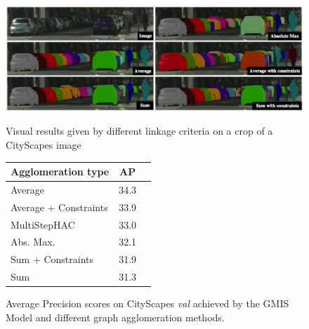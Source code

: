 \captionsetup[subtable]{labelformat=simple, labelsep=space, justification=centering, singlelinecheck=off}
\renewcommand*{\thesubtable}{(\alph{subtable})}
\begin{figure}[t]
\begin{minipage}{0.65 \textwidth}
\centering
\includegraphics[width=\textwidth]{./figs/cityscapes_compare_5.eps} %
\caption{Visual results given by different \algname{} linkage criteria on a crop of a CityScapes image}\label{fig:cityscapes}
\end{minipage}\hfill
\begin{minipage}{0.3 \textwidth}
    \centering
    \small
        \begin{tabular}[t]{l|cc}
             Agglomeration type & AP \\ \midrule
              \algname{} Average& 34.3 \\
              \algname{} Average + Constraints & 33.9 \\
             MultiStepHAC \cite{liu2018affinity} & 33.0 \\
              \algname{} Abs. Max. \cite{wolf2018mutex}  & 32.1 \\
              \algname{} Sum + Constraints  \cite{levinkov2017comparative} & 31.9  \\
              \algname{} Sum \cite{keuper2015efficient} & 31.3 \\
        \end{tabular}
    \vspace*{0.6em}
    \caption{Average Precision scores on CityScapes \emph{val} achieved by the GMIS Model \cite{liu2018affinity} and different graph agglomeration methods.}
    \label{tab:results_cityscapes_val}
\end{minipage}
\end{figure}

